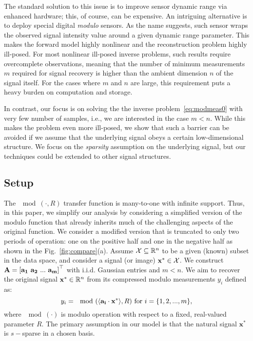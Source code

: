 The standard solution to this issue is to improve sensor dynamic range via enhanced hardware; this, of course, can be expensive. An intriguing alternative is to deploy special digital \emph{modulo} sensors. As the name suggests, such sensor wraps the observed signal intensity value around a given dynamic range parameter. This makes the forward model highly nonlinear and the reconstruction problem highly ill-posed. For most nonlinear ill-posed inverse problems, such results require overcomplete observations, meaning that the number of minimum measurements $m$ required for signal recovery is higher than the ambient dimension $n$ of the signal itself. For the cases where $m$ and $n$ are large, this requirement puts a heavy burden on computation and storage. 

In contrast, our focus is on solving the the inverse problem~\eqref{eq:modmeas0} with very few number of samples, {i.e.}, we are interested in the case $m<n$. While this makes the problem even more ill-posed, we show that such a barrier can be avoided if we assume that the underlying signal obeys a certain low-dimensional structure. We focus on the \emph{sparsity} assumption on the underlying signal, but our techniques could be extended to other signal structures.  

\subsection{Setup}
\label{subsec:setup}
The $\mod(\cdot,R)$ transfer function is many-to-one with infinite support. Thus, in this paper, we simplify our analysis by considering a simplified version of the modulo function that already inherits much of the challenging aspects of the original function. We consider a modified version that is truncated to only two periods of operation: one on the positive half and one in the negative half as shown in the Fig.~\ref{fig:compare}(a). %
Assume $\mathcal{X} \subseteq {\mathbb{R}}^n$ to be a given (known) subset in the data space, and consider a signal (or image) $\mathbf{x}^* \in \mathcal{X}$. We construct $\mathbf{A} = \left[\mathbf{a_1~a_2~...~a_m}\right]^\top$ with i.i.d. Gaussian entries and $m<n$. We aim to recover the original signal $\mathbf{x^*}\in {\mathbb{R}}^n$ from its compressed modulo measurements $y_i$ defined as:
\begin{equation}
y_i=\mod(\langle \mathbf{a_i} \cdot \mathbf{x^*} \rangle,R)~\textnormal{for}~i = \{1,2,...,m\},
\label{eq:modmeas1}
\end{equation} 
where $\mod(\cdot)$ is modulo operation with respect to a fixed, real-valued parameter $R$. The primary assumption in our model is that the natural signal $\mathbf{x^*}$ is $s-$sparse in a chosen basis. 

